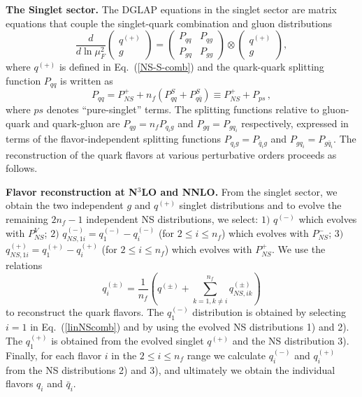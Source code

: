 \documentclass[12pt,notitlepage,aps,preprintnumbers,superscriptaddress,nofootinbib,aps,prd,floatfix]{revtex4-2}
\begin{document}
{\bf The Singlet sector.} The DGLAP equations in 
the singlet sector are matrix equations that couple the singlet-quark combination and gluon distributions
%
\begin{equation}
\frac{d}{d\ln \mu_F^2} \begin{pmatrix}q^{(+)} \\ g\end{pmatrix} = \begin{pmatrix}P_{qq} & P_{qg} \\ P_{gq} & P_{gg}\end{pmatrix} \otimes \begin{pmatrix}q^{(+)} \\ g\end{pmatrix},
\label{eq:dglap-singlet}
\end{equation}
%
where $q^{(+)}$ is defined in Eq.~(\ref{NS-S-comb}) and the quark-quark splitting function $P_{qq}$ is written as
%
\begin{equation}
P_{qq}=P_{NS}^{+}+n_{f}\left(P_{qq}^{S}+P_{q\bar{q}}^{S}\right)\equiv P_{NS}^{+}+P_{ps}\,,
\label{Pqq-expr}
\end{equation}
%
where $ps$ denotes ``pure-singlet'' terms. The splitting functions relative to gluon-quark and quark-gluon are $P_{qg}=n_{f}P_{q_{i}g}$ and $P_{gq}=P_{gq_{i}}$ respectively, expressed in terms of the flavor-independent splitting functions $P_{q_{i}g}=P_{\bar{q}_{i}g}$
and $P_{gq_{i}}=P_{g\bar{q}_{i}}$.
The reconstruction of the quark flavors at various perturbative orders proceeds as follows. 

{\bf Flavor reconstruction at N$^3$LO and NNLO.} 
%
From the singlet sector, we obtain the two independent $g$ and $q^{(+)}$ singlet distributions and to evolve the remaining $2n_{f}-1$ independent NS distributions, we select: $1)$ $q^{(-)}$ which evolves with $P_{NS}^{V}$; $2)$ $q_{NS,1i}^{(-)}=q_{1}^{(-)}-q_{i}^{(-)}$ (for 
$2\leq i\leq n_{f}$) which evolves with $P_{NS}^{-}$; $3)$ $q_{NS,1i}^{(+)}=q_{1}^{(+)}-q_{i}^{(+)}$ (for 
$2\leq i\leq n_{f}$) which evolves with $P_{NS}^{+}$. We use the relations 
%
\begin{equation}
q_{i}^{(\pm)}=\frac{1}{n_{f}}\left(q^{(\pm)}+\sum_{k=1,k\neq i}^{n_{f}}q_{NS,ik}^{(\pm)}\right)
\label{linNScomb}
\end{equation}
%
to reconstruct the quark flavors. 
%
The $q_{1}^{(-)}$ distribution is obtained by selecting $i=1$ in Eq.~(\ref{linNScomb}) and by
using the evolved NS distributions 1) and 2). 
%
The $q_{1}^{(+)}$ is obtained from
the evolved singlet $q^{(+)}$ and the NS distribution 3). 
%
Finally, for each flavor $i$ in the $2\leq i\leq n_{f}$ range we calculate $q_{i}^{(-)}$ and
$q_{i}^{(+)}$ from the NS distributions 2) and 3), and ultimately we obtain the individual flavors $q_{i}$ and $\bar{q}_{i}$.
%
\end{document}
